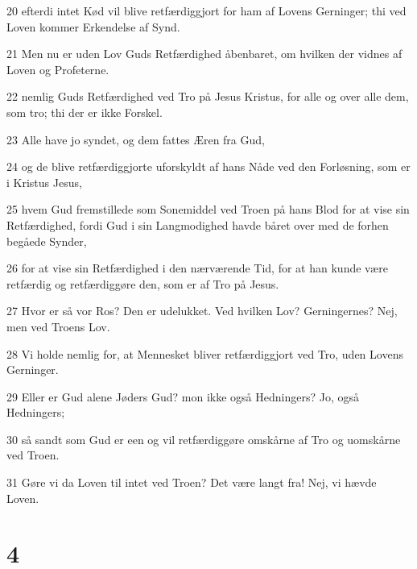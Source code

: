 \par 20 efterdi intet Kød vil blive retfærdiggjort for ham af Lovens Gerninger; thi ved Loven kommer Erkendelse af Synd.
\par 21 Men nu er uden Lov Guds Retfærdighed åbenbaret, om hvilken der vidnes af Loven og Profeterne.
\par 22 nemlig Guds Retfærdighed ved Tro på Jesus Kristus, for alle og over alle dem, som tro; thi der er ikke Forskel.
\par 23 Alle have jo syndet, og dem fattes Æren fra Gud,
\par 24 og de blive retfærdiggjorte uforskyldt af hans Nåde ved den Forløsning, som er i Kristus Jesus,
\par 25 hvem Gud fremstillede som Sonemiddel ved Troen på hans Blod for at vise sin Retfærdighed, fordi Gud i sin Langmodighed havde båret over med de forhen begåede Synder,
\par 26 for at vise sin Retfærdighed i den nærværende Tid, for at han kunde være retfærdig og retfærdiggøre den, som er af Tro på Jesus.
\par 27 Hvor er så vor Ros? Den er udelukket. Ved hvilken Lov? Gerningernes? Nej, men ved Troens Lov.
\par 28 Vi holde nemlig for, at Mennesket bliver retfærdiggjort ved Tro, uden Lovens Gerninger.
\par 29 Eller er Gud alene Jøders Gud? mon ikke også Hedningers? Jo, også Hedningers;
\par 30 så sandt som Gud er een og vil retfærdiggøre omskårne af Tro og uomskårne ved Troen.
\par 31 Gøre vi da Loven til intet ved Troen? Det være langt fra! Nej, vi hævde Loven.

\chapter{4}

